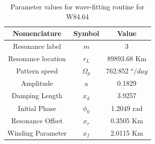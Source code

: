 \documentclass{article}
\begin{document}
\begin{table}
\centering
\begin{tabular}{|c|c|c|}
\hline
\textbf{Nomenclature} & \textbf{Symbol} & \textbf{Value} \\
\hline
Resonance label & $m$ & 3 \\
\hline
Resonance location & $r_{L}$ & 89893.68 Km \\
\hline
Pattern speed & $\Omega_{p}$ & 762.852 $^{o}/day$ \\
\hline
Amplitude & a & 0.1829 \\
\hline
Damping Length & $x_{d}$ & 3.9257 \\
\hline
Initial Phase & $\phi_{0}$ & 1.2049 rad \\
\hline
Resonance Offset & $x_{r}$ & 0.3505 Km \\
\hline
Winding Parameter & $x_{f}$ & 2.0115 Km \\
\hline
\end{tabular}
\caption{Parameter values for wave-fitting routine for W84.64}
\end{table}







\end{document}

